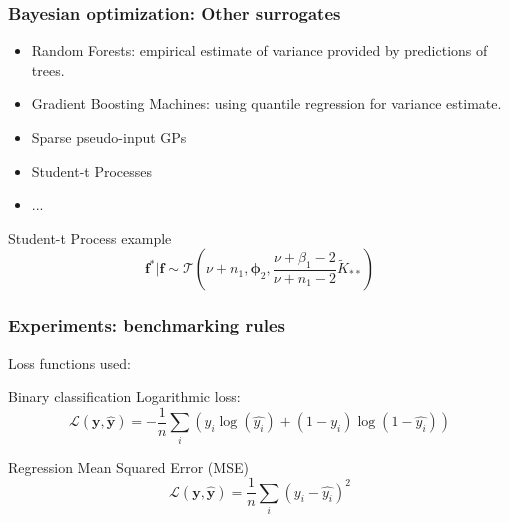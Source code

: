 \documentclass[10pt]{beamer}
\begin{document}
		\begin{frame}
		\frametitle{Bayesian optimization: Other surrogates}
		\begin{itemize}
		\item Random Forests: empirical estimate of variance provided by predictions of trees.
		\item Gradient Boosting Machines: using quantile regression for variance estimate.
		\item Sparse pseudo-input GPs
		\item Student-t Processes
		\item ...
		\end{itemize}
		
		\begin{block}{Student-t Process example}
		\begin{equation}
		\boldsymbol{f}^*|\boldsymbol{f} \sim \mathcal{T}\left(\nu + n_1, \boldsymbol{\phi}_2, \dfrac{\nu + 				\beta_1 - 2}{\nu + n_1 - 2} \tilde{K}_{**} \right)
		\end{equation}
		\end{block}
		\end{frame}
		
		\begin{frame}
		\frametitle{Experiments: benchmarking rules}
		Loss functions used:
		\begin{block}{Binary classification}
		Logarithmic loss:
		\begin{equation}
		\mathcal{L}(\boldsymbol{y}, \boldsymbol{\hat{y}}) = -\dfrac{1}{n} \sum_i \left(y_i \log(\hat{y_i}) + 			(1 - y_i)\log(1-\hat{y_i})\right)
		\end{equation}
		\end{block}
		
		\begin{block}{Regression}
		Mean Squared Error (MSE)
		\begin{equation}
		\mathcal{L}(\boldsymbol{y}, \boldsymbol{\hat{y}}) = \dfrac{1}{n} \sum_i \left(y_i - \hat{y_i}\right)^2
		\end{equation}
		\end{block}		
		\end{frame}
		
\end{document}
